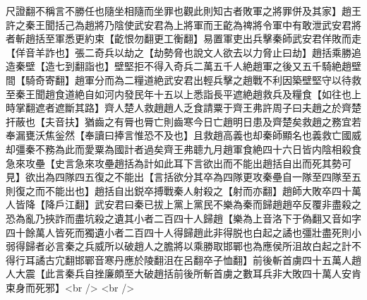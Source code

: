 尺證翻不稱言不勝任也隨坐相隨而坐罪也觀此則知古者敗軍之將罪併及其家】趙王許之秦王聞括己為趙將乃陰使武安君為上將軍而王齕為禆將令軍中有敢泄武安君將者斬趙括至軍悉更約束【齕恨勿翻更工衡翻】易置軍吏出兵擊秦師武安君佯敗而走【佯音羊詐也】張二奇兵以劫之【劫勢脅也說文人欲去以力脅止曰劫】趙括乘勝追造秦壁【造七到翻詣也】壁堅拒不得入奇兵二萬五千人絶趙軍之後又五千騎絶趙壁間【騎奇寄翻】趙軍分而為二糧道絶武安君出輕兵擊之趙戰不利因築壁堅守以待救至秦王聞趙食道絶自如河内發民年十五以上悉詣長平遮絶趙救兵及糧食【如往也上時掌翻遮者遮斷其路】齊人楚人救趙趙人乏食請粟于齊王弗許周子曰夫趙之於齊楚扞蔽也【夫音扶】猶齒之有脣也脣亡則齒寒今日亡趙明日患及齊楚矣救趙之務宜若奉漏甕沃焦釡然【奉讀曰捧言惟恐不及也】且救趙高義也却秦師顯名也義救亡國威却彊秦不務為此而愛粟為國計者過矣齊王弗聼九月趙軍食絶四十六日皆内陰相殺食急來攻壘【史言急來攻壘趙括為計如此耳下言欲出而不能出趙括自出而死其勢可見】欲出為四隊四五復之不能出【言括欲分其卒為四隊更攻秦壘自一隊至四隊至五則復之而不能出也】趙括自出鋭卒搏戰秦人射殺之【射而亦翻】趙師大敗卒四十萬人皆降【降戶江翻】武安君曰秦已拔上黨上黨民不樂為秦而歸趙趙卒反覆非盡殺之恐為亂乃挾詐而盡坑殺之遺其小者二百四十人歸趙【樂為上音洛下于偽翻又音如字四十餘萬人皆死而獨遺小者二百四十人得歸趙此非得脱也白起之譎也彊壯盡死則小弱得歸者必言秦之兵威所以破趙人之膽將以乘勝取邯鄲也為應侯所沮故白起之計不得行耳譎古宂翻邯鄲音寒丹應於陵翻沮在呂翻卒子恤翻】前後斬首虜四十五萬人趙人大震【此言秦兵自挫廉頗至大破趙括前後所斬首虜之數耳兵非大敗四十萬人安肯束身而死邪】<br />
<br />
